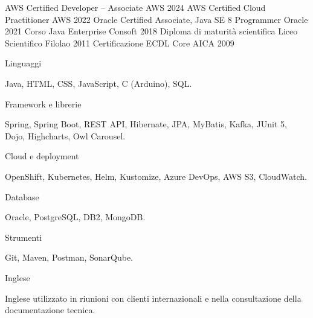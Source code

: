 \documentclass[]{style}
\begin{document}
\begin{cvhonors}
	\cvhonor
	{AWS Certified Developer – Associate}
	{}
	{AWS}
	{2024}
	\cvhonor
	{AWS Certified Cloud Practitioner}
	{}
	{AWS}
	{2022}
	\cvhonor
	{Oracle Certified Associate, Java SE 8 Programmer}
	{}
	{Oracle}
	{2021}
	\cvhonor
	{Corso Java Enterprise}
	{}
	{Consoft}
	{2018}
	\cvhonor
	{Diploma di maturità scientifica}
	{}
	{Liceo Scientifico Filolao}
	{2011}
	\cvhonor
	{Certificazione ECDL Core}
	{}
	{AICA}
	{2009}
\end{cvhonors}

\begin{cventries}
	\cvskillentry
	{Linguaggi}
	{\begin{cventryparagraph}
		\item {Java, HTML, CSS, JavaScript, C (Arduino), SQL.}
	\end{cventryparagraph}}
	
	\cvskillentry
	{Framework e librerie}
	{\begin{cventryparagraph}
		\item {Spring, Spring Boot, REST API, Hibernate, JPA, MyBatis, Kafka, JUnit 5, Dojo, Highcharts, Owl Carousel.}
	\end{cventryparagraph}}
	
	\cvskillentry
	{Cloud e deployment}
	{\begin{cventryparagraph}
		\item {OpenShift, Kubernetes, Helm, Kustomize, Azure DevOps, AWS S3, CloudWatch.}
	\end{cventryparagraph}}
	
	\cvskillentry
	{Database}
	{\begin{cventryparagraph}
		\item {Oracle, PostgreSQL, DB2, MongoDB.}
	\end{cventryparagraph}}
	
	\cvskillentry
	{Strumenti}
	{\begin{cventryparagraph}
		\item {Git, Maven, Postman, SonarQube.}
	\end{cventryparagraph}}

	\cvskillentry
	{Inglese}
	{\begin{cventryparagraph}
		\item {Inglese utilizzato in riunioni con clienti internazionali e nella consultazione della documentazione tecnica.}
	\end{cventryparagraph}}
\end{cventries}
\end{document}
